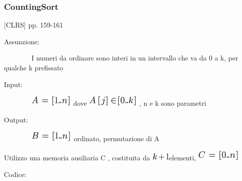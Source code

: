 \documentclass{article}
\begin{document}
\hypertarget{h.bfk18jaq5ar4}{\subsubsection{\texorpdfstring{{CountingSort}}{CountingSort}}\label{h.bfk18jaq5ar4}}

{{[}CLRS{]} pp. 159-161}

{}

{Assunzione:}

{~~~~~~~~I numeri da ordinare sono interi in un intervallo che va da 0 a
k, per qualche k prefissato}

{Input:}

{~~~~~~~~}\includegraphics{images/image182.png}{~dove
}\includegraphics{images/image183.png}{~, n e k sono parametri}

{Output:}

{~~~~~~~~}\includegraphics{images/image184.png}{~}{ordinato}{,
permutazione di A}

{Utilizzo una memoria ausiliaria C , costituita da
}\includegraphics{images/image185.png}{elementi,
}\includegraphics{images/image186.png}

{Codice:}

{}

{~~~~~~~~}

\protect\hypertarget{t.838fe42014bbeb1605fc7de3c1957472acce8e3d}{}{}\protect\hypertarget{t.27}{}{}
\end{document}
